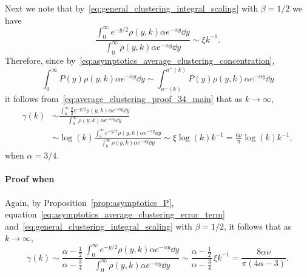 Next we note that by~\eqref{eq:general_clustering_integral_scaling} with $\beta = 1/2$ we have
\[
	\frac{\int_0^\infty e^{-y/2} \rho(y,k) \alpha e^{-\alpha y} \dd y}{\int_0^\infty \rho(y,k) \alpha e^{-\alpha y} \dd y}
	\sim \xi k^{-1}.
\]
Therefore, since by~\eqref{eq:asymptotics_average_clustering_concentration},
\[
	\int_0^\infty P(y) \rho(y,k) \alpha e^{-\alpha y} \dd y \sim \int_{a^-(k)}^{a^+(k)} P(y) \rho(y,k) \alpha e^{-\alpha y} \dd y
\]
it follows from~\eqref{eq:average_clustering_proof_34_main} that as $k \to \infty$,
\begin{align*}
	\gamma(k) &\sim \frac{\int_0^\infty \frac{y}{2} e^{-y/2} \rho(y,k) \alpha e^{-\alpha y} \dd y}
		{\int_0^\infty \rho(y,k) \alpha e^{-\alpha y} \dd y} \\
	&\sim \log(k) \frac{\int_0^\infty e^{-y/2} \rho(y,k) \alpha e^{-\alpha y} \dd y}
	{\int_0^\infty \rho(y,k) \alpha e^{-\alpha y} \dd y}
	\sim \xi \log(k)k^{-1} = \frac{6\nu}{\pi} \log(k) k^{-1},
\end{align*}
when $\alpha = 3/4$.

\paragraph{Proof when }

Again, by Proposition~\ref{prop:asymptotics_P}, equation~\eqref{eq:asymptotics_average_clustering_error_term} and~\eqref{eq:general_clustering_integral_scaling} with $\beta = 1/2$, it follows that as $k \to \infty$,
\[
	\gamma(k) \sim \frac{\alpha - \frac{1}{2}}{\alpha - \frac{3}{4}} \, \frac{\int_0^{\infty} e^{-y/2} \rho(y,k) \alpha  e^{-\alpha y} \dd y} {\int_0^\infty \rho(y,k) \alpha e^{-\alpha y} \dd y} 
	\sim \frac{\alpha - \frac{1}{2}}{\alpha - \frac{3}{4}} \, \xi k^{-1} = \frac{8\alpha \nu}{\pi(4\alpha - 3)}.
\]

